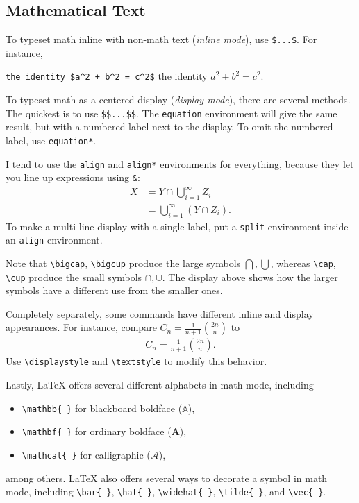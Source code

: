\documentclass[a4paper,10pt,leqno]{article}
\numberwithin{equation}{section}
\theoremstyle{plain}
\theoremstyle{definition}
\theoremstyle{remark}
\begin{document}
\subsection{Mathematical Text}

To typeset math inline with non-math text (\emph{inline mode}), use \verb|$...$|.
For instance,
\begin{center}
\verb|the identity $a^2 + b^2 = c^2$|
\quad
the identity $a^2 + b^2 = c^2$.
\end{center}
To typeset math as a centered display (\emph{display mode}), there are several methods.
The quickest is to use \verb|$$...$$|.
The \texttt{equation} environment will give the same result, but with a numbered label next to the display.
To omit the numbered label, use \texttt{equation*}.

I tend to use the \texttt{align} and \texttt{align*} environments for everything, because they let you line up expressions using \verb|&|:
\begin{align}\label{eq:1}
X 
	&= Y \cap \bigcup_{i = 1}^\infty Z_i\\
	&= \bigcup_{i = 1}^\infty {(Y \cap Z_i)}.
\end{align}
To make a multi-line display with a single label, put a \texttt{split} environment inside an \texttt{align} environment.

Note that \verb|\bigcap|, \verb|\bigcup| produce the large symbols $\bigcap, \bigcup$, whereas \verb|\cap|, \verb|\cup| produce the small symbols $\cap, \cup$.
The display above shows how the larger symbols have a different use from the smaller ones.

Completely separately, some commands have different inline and display appearances.
For instance, compare $C_n = \frac{1}{n + 1} \binom{2n}{n}$ to
\begin{align*}
C_n = \frac{1}{n + 1} \binom{2n}{n}.
\end{align*}
Use \verb|\displaystyle| and \verb|\textstyle| to modify this behavior.

Lastly, \LaTeX{} offers several different alphabets in math mode, including
\begin{itemize} 
\item 	\verb|\mathbb{ }| for blackboard boldface ($\mathbb{A}$),

\item 	\verb|\mathbf{ }| for ordinary boldface ($\mathbf{A}$), 

\item 	\verb|\mathcal{ }| for calligraphic ($\mathcal{A}$),

\end{itemize}
among others.
\LaTeX{} also offers several ways to decorate a symbol in math mode, including \verb|\bar{ }|, \verb|\hat{ }|, \verb|\widehat{ }|, \verb|\tilde{ }|, and \verb|\vec{ }|.
\end{document}
